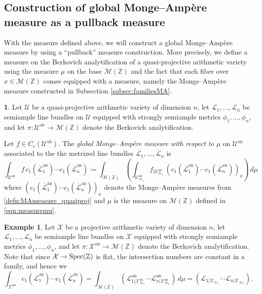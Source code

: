 \documentclass[11pt,reqno]{amsart}
\newcommand{\mZ}{\mathbb{Z}}
\newcommand{\cX}{\mathcal{X}}
\newcommand{\cU}{\mathcal{U}}
\newcommand{\cL}{\mathcal{L}}
\newcommand{\sH}{{\mathscr H}}
\newcommand{\sM}{{\mathscr M}}
\theoremstyle{theorem}
\numberwithin{equation}{subsection}
\numberwithin{equation}{subsection}
\theoremstyle{definition}
\newtheorem{definition}[subsubsection]{\text{Definition}}
\newtheorem{example}[subsubsection]{Example}
\theoremstyle{remark}
\numberwithin{equation}{subsubsection} \numberwithin{figure}{section}
\DeclareMathOperator{\an}{an}
\newcommand{\cdef}[1]{\textsf{\textit{#1}}}
\begin{document}
\subsection{Construction of global Monge--Amp\`ere measure as a pullback measure}
With the measure defined above, we will construct a global Monge--Amp\`ere measure by using a ``pullback'' measure construction.  
More precisely, we define a measure on the Berkovich analytification of a quasi-projective arithmetic variety using the measure $\mu$ on the base $\sM(\mZ)$ and the fact that each fiber over $x \in \sM(\mZ)$ comes equipped with a measure, namely the Monge--Amp\`ere measure constructed in Subsection \ref{subsec:familiesMA}. 

\begin{definition}
Let $\cU$ be a quasi-projective arithmetic variety of dimension $n$, let $\cL_1,\dots,\cL_n$ be semiample line bundles on $\cU$ equipped with strongly semiample metrics $\phi_1,\dots,\phi_n$, and let $\pi\colon \cU^{\an} \to \sM(\mZ)$ denote the Berkovich analytification. 


Let $f\in C_c(\cU^{\an})$. 
The \cdef{global Monge--Amp\`ere measure with respect to $\mu$} on $\cU^{\an}$ associated to the the metrized line bundles $\overline{\cL}_1,\dots,\overline{\cL}_n$ is 
\[
\int_{\cU^{\an}} f \, c_1(\overline{\cL}^{\an}_1)\cdots c_1(\overline{\cL}^{\an}_n) \coloneqq \int_{\sM(\mZ)} \left( \int_{\cU_{\sH_x}^{\an}} f_{|\cU_{\sH_x}^{\an}} \, (c_1(\overline{\cL}^{\an}_1)\cdots c_1(\overline{\cL}^{\an}_n))_x\right)\, d\mu
\]
where $(c_1(\overline{\cL}_1^{\an})\cdots c_1(\overline{\cL}_n^{\an}))_x$ denote the Monge--Amp\`ere measures from \autoref{defn:MAmeasure_quasiproj} and $\mu$ is the measure on $\sM(\mZ)$ defined in \eqref{eqn:measuremu}. 
\end{definition}

\begin{example}
Let $\cX$ be a projective arithmetic variety of dimension $n$, let $\cL_1,\dots,\cL_n$ be semiample line bundles on $\cX$ equipped with strongly semiample metrics $\phi_1,\dots,\phi_n$, and let $\pi\colon \cX^{\an} \to \sM(\mZ)$ denote the Berkovich analytification. 
Note that since $\cX \to \Spec(\mZ)$ is flat, the intersection numbers are constant in a family, and hence we
\[
\int_{\cX^{\an}} c_1(\overline{\cL}^{\an}_1)\cdots c_1(\overline{\cL}^{\an}_n)  = \int_{\sM(\mZ)} (\cL_{1|\cX^{\an}_{\sH_x}}^{\an} \cdots \cL_{n|\cX^{\an}_{\sH_x}}^{\an}) \, d\mu = (\cL_{1|\cX_{\sH_x}} \cdots \cL_{n|\cX_{\sH_x}}).
\]
\end{example}
\end{document}
